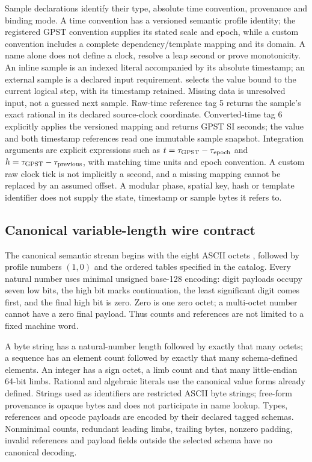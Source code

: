 Sample declarations identify their type, absolute time convention, provenance
and binding mode. A time convention has a versioned semantic profile identity;
the registered GPST convention supplies its stated scale and epoch, while a
custom convention includes a complete dependency/template mapping and its domain.
A name alone does not define a clock, resolve a leap second or prove monotonicity.
An inline sample is an indexed literal accompanied by its
absolute timestamp; an external sample is a declared input requirement.
 selects the value bound to the current logical step, with its
timestamp retained. Missing data is unresolved input, not a guessed next sample.
Raw-time reference tag 5 returns the sample's exact rational in its declared
source-clock coordinate. Converted-time tag 6 explicitly applies the versioned
mapping and returns GPST SI seconds; the value and both timestamp references
read one immutable sample snapshot. Integration arguments are explicit
expressions such as $t=\tau_{\rm GPST}-\tau_{\rm epoch}$ and
$h=\tau_{\rm GPST}-\tau_{\rm previous}$, with matching time units and epoch
convention. A custom raw clock tick is not implicitly a second, and a missing
mapping cannot be replaced by an assumed offset.
A modular phase, spatial key, hash or template identifier does not supply the
state, timestamp or sample bytes it refers to.

\subsection{Canonical variable-length wire contract}
The canonical semantic stream begins with the eight ASCII octets
, followed by profile numbers $(1,0)$ and the ordered tables
specified in the catalog. Every natural number uses minimal unsigned base-128
encoding: digit payloads occupy seven low bits, the high bit marks continuation,
the least significant digit comes first, and the final high bit is zero.
Zero is one zero octet; a multi-octet number cannot have a zero final payload.
Thus counts and references are not limited to a fixed machine word.

A byte string has a natural-number length followed by exactly that many octets;
a sequence has an element count followed by exactly that many schema-defined
elements. An integer has a sign octet, a limb count and that many little-endian
64-bit limbs. Rational and algebraic literals use the canonical value forms
already defined. Strings used as identifiers are restricted ASCII byte strings;
free-form provenance is opaque bytes and does not participate in name lookup.
Types, references and opcode payloads are encoded by their declared tagged
schemas. Nonminimal counts, redundant leading limbs, trailing bytes, nonzero
padding, invalid references and payload fields outside the selected schema have
no canonical decoding.

